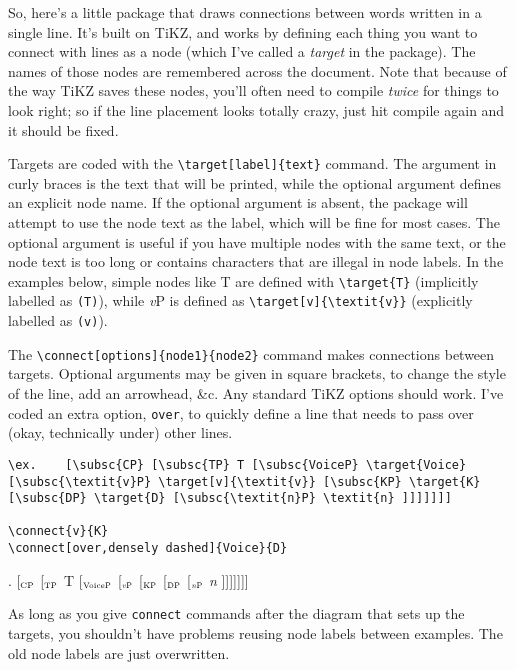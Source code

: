 \documentclass{article}
\newcommand{\subsc}[1]{$_{\textrm{\tiny #1}}$}
\begin{document}
So, here's a little package that draws connections between words written in a single line. It's built on TiKZ, and works by defining each thing you want to connect with lines as a node (which I've called a \textit{target} in the package). The names of those nodes are remembered across the document.
Note that because of the way TiKZ saves these nodes, you'll often need to compile \textit{twice} for things to look right; so if the line placement looks totally crazy, just hit compile again and it should be fixed.

Targets are coded with the \verb;\target[label]{text}; command. The argument in curly braces is the text that will be printed, while the optional argument defines an explicit node name. If the optional argument is absent, the package will attempt to use the node text as the label, which will be fine for most cases. The optional argument is useful if you have multiple nodes with the same text, or the node text is too long or contains characters that are illegal in node labels. In the examples below, simple nodes like T are defined with \verb;\target{T}; (implicitly labelled as \texttt{(T)}), while \textit{v}P is defined as \verb;\target[v]{\textit{v}}; (explicitly labelled as \texttt{(v)}).

The \verb;\connect[options]{node1}{node2}; command makes connections between targets. Optional arguments may be given in square brackets, to change the style of the line, add an arrowhead, \&c. Any standard TiKZ options should work. I've coded an extra option, \verb;over;, to quickly define a line that needs to pass over (okay, technically under) other lines.

\begin{verbatim}
\ex.	[\subsc{CP} [\subsc{TP} T [\subsc{VoiceP} \target{Voice} 
[\subsc{\textit{v}P} \target[v]{\textit{v}} [\subsc{KP} \target{K} 
[\subsc{DP} \target{D} [\subsc{\textit{n}P} \textit{n} ]]]]]]]

\connect{v}{K}
\connect[over,densely dashed]{Voice}{D}
\end{verbatim}

\ex.	[\subsc{CP} [\subsc{TP} T [\subsc{VoiceP}  [\subsc{\textit{v}P}  [\subsc{KP}  [\subsc{DP}  [\subsc{\textit{n}P} \textit{n} ]]]]]]]


As long as you give \texttt{connect} commands after the diagram that sets up the targets, you shouldn't have problems reusing node labels between examples. The old node labels are just overwritten.
\end{document}
